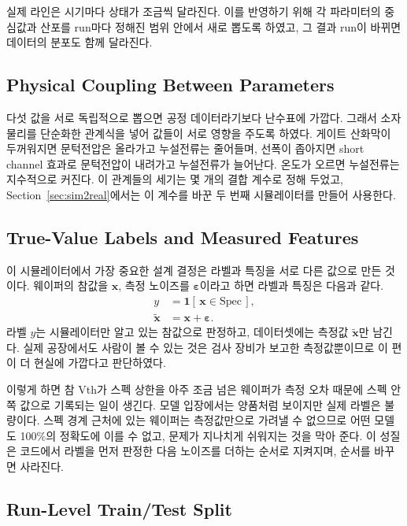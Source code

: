 \documentclass[10pt,twocolumn,a4paper]{article}
\begin{document}
실제 라인은 시기마다 상태가 조금씩 달라진다. 이를 반영하기 위해 각 파라미터의 중심값과
산포를 run마다 정해진 범위 안에서 새로 뽑도록 하였고, 그 결과 run이 바뀌면 데이터의 분포도
함께 달라진다.

\subsection{Physical Coupling Between Parameters}

다섯 값을 서로 독립적으로 뽑으면 공정 데이터라기보다 난수표에 가깝다. 그래서 소자 물리를
단순화한 관계식을 넣어 값들이 서로 영향을 주도록 하였다. 게이트 산화막이 두꺼워지면
문턱전압은 올라가고 누설전류는 줄어들며, 선폭이 좁아지면 short channel 효과로 문턱전압이
내려가고 누설전류가 늘어난다. 온도가 오르면 누설전류는 지수적으로 커진다. 이 관계들의 세기는
몇 개의 결합 계수로 정해 두었고, Section~\ref{sec:sim2real}에서는 이 계수를 바꾼 두 번째 시뮬레이터를 만들어
사용한다.

\subsection{True-Value Labels and Measured Features}

이 시뮬레이터에서 가장 중요한 설계 결정은 라벨과 특징을 서로 다른 값으로 만든 것이다. 웨이퍼의 참값을
$\bm{x}$, 측정 노이즈를 $\bm{\varepsilon}$이라고 하면 라벨과 특징은 다음과 같다.
\begin{align}
  y &= \mathbf{1}\!\left[\,\bm{x} \in \text{Spec}\,\right], \label{eq:label}\\
  \tilde{\bm{x}} &= \bm{x} + \bm{\varepsilon}. \label{eq:meas}
\end{align}
라벨 $y$는 시뮬레이터만 알고 있는 참값으로 판정하고, 데이터셋에는 측정값 $\tilde{\bm{x}}$만
남긴다. 실제 공장에서도 사람이 볼 수 있는 것은 검사 장비가 보고한 측정값뿐이므로 이 편이 더
현실에 가깝다고 판단하였다.

이렇게 하면 참 Vth가 스펙 상한을 아주 조금 넘은 웨이퍼가 측정 오차 때문에 스펙 안쪽 값으로
기록되는 일이 생긴다. 모델 입장에서는 양품처럼 보이지만 실제 라벨은 불량이다. 스펙 경계 근처에
있는 웨이퍼는 측정값만으로 가려낼 수 없으므로 어떤 모델도 100\%의 정확도에 이를 수 없고,
문제가 지나치게 쉬워지는 것을 막아 준다. 이 성질은 코드에서 라벨을 먼저 판정한 다음 노이즈를
더하는 순서로 지켜지며, 순서를 바꾸면 사라진다.

\subsection{Run-Level Train/Test Split}
\end{document}
